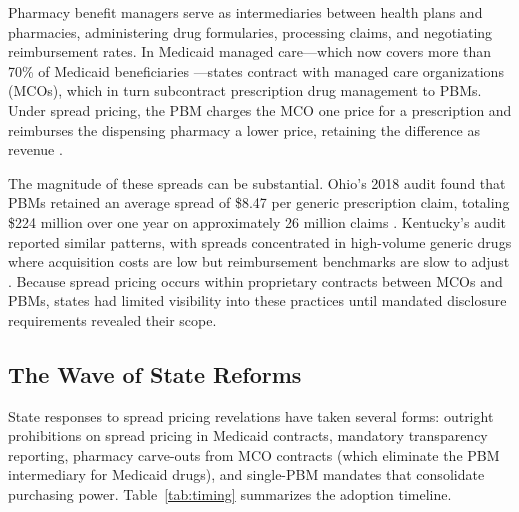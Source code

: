 \documentclass[12pt]{article}
\begin{document}
Pharmacy benefit managers serve as intermediaries between health plans and pharmacies, administering drug formularies, processing claims, and negotiating reimbursement rates. In Medicaid managed care---which now covers more than 70\% of Medicaid beneficiaries \citep{cms2022managed}---states contract with managed care organizations (MCOs), which in turn subcontract prescription drug management to PBMs. Under spread pricing, the PBM charges the MCO one price for a prescription and reimburses the dispensing pharmacy a lower price, retaining the difference as revenue \citep{sood2017flow}.

The magnitude of these spreads can be substantial. Ohio's 2018 audit found that PBMs retained an average spread of \$8.47 per generic prescription claim, totaling \$224 million over one year on approximately 26 million claims \citep{ohio2018audit}. Kentucky's audit reported similar patterns, with spreads concentrated in high-volume generic drugs where acquisition costs are low but reimbursement benchmarks are slow to adjust \citep{kentucky2020pbm}. Because spread pricing occurs within proprietary contracts between MCOs and PBMs, states had limited visibility into these practices until mandated disclosure requirements revealed their scope.

\subsection{The Wave of State Reforms}

State responses to spread pricing revelations have taken several forms: outright prohibitions on spread pricing in Medicaid contracts, mandatory transparency reporting, pharmacy carve-outs from MCO contracts (which eliminate the PBM intermediary for Medicaid drugs), and single-PBM mandates that consolidate purchasing power. Table~\ref{tab:timing} summarizes the adoption timeline.
\end{document}

